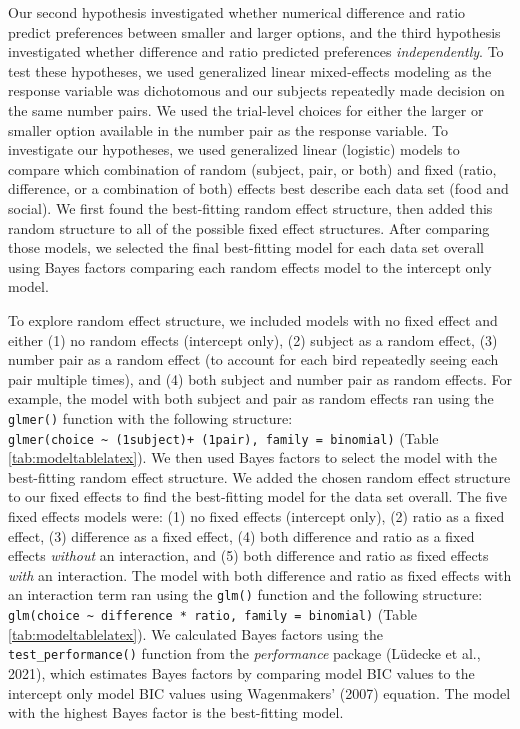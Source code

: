 \documentclass[
  ,pub,floatsintext]{apa6}
\begin{document}
Our second hypothesis investigated whether numerical difference and ratio predict preferences between smaller and larger options, and the third hypothesis investigated whether difference and ratio predicted preferences \emph{independently}. To test these hypotheses, we used generalized linear mixed-effects modeling as the response variable was dichotomous and our subjects repeatedly made decision on the same number pairs. We used the trial-level choices for either the larger or smaller option available in the number pair as the response variable. To investigate our hypotheses, we used generalized linear (logistic) models to compare which combination of random (subject, pair, or both) and fixed (ratio, difference, or a combination of both) effects best describe each data set (food and social). We first found the best-fitting random effect structure, then added this random structure to all of the possible fixed effect structures. After comparing those models, we selected the final best-fitting model for each data set overall using Bayes factors comparing each random effects model to the intercept only model.

To explore random effect structure, we included models with no fixed effect and either (1) no random effects (intercept only), (2) subject as a random effect, (3) number pair as a random effect (to account for each bird repeatedly seeing each pair multiple times), and (4) both subject and number pair as random effects. For example, the model with both subject and pair as random effects ran using the \texttt{glmer()} function with the following structure: \texttt{glmer(choice\ \textasciitilde{}\ (1\textbar{}subject)+\ (1\textbar{}pair),\ family\ =\ binomial)} (Table \ref{tab:modeltablelatex}). We then used Bayes factors to select the model with the best-fitting random effect structure. We added the chosen random effect structure to our fixed effects to find the best-fitting model for the data set overall. The five fixed effects models were: (1) no fixed effects (intercept only), (2) ratio as a fixed effect, (3) difference as a fixed effect, (4) both difference and ratio as a fixed effects \emph{without} an interaction, and (5) both difference and ratio as fixed effects \emph{with} an interaction. The model with both difference and ratio as fixed effects with an interaction term ran using the \texttt{glm()} function and the following structure: \texttt{glm(choice\ \textasciitilde{}\ difference\ *\ ratio,\ family\ =\ binomial)} (Table \ref{tab:modeltablelatex}). We calculated Bayes factors using the \texttt{test\_performance()} function from the \emph{performance} package (Lüdecke et al., 2021), which estimates Bayes factors by comparing model BIC values to the intercept only model BIC values using Wagenmakers' (2007) equation. The model with the highest Bayes factor is the best-fitting model.
\end{document}
